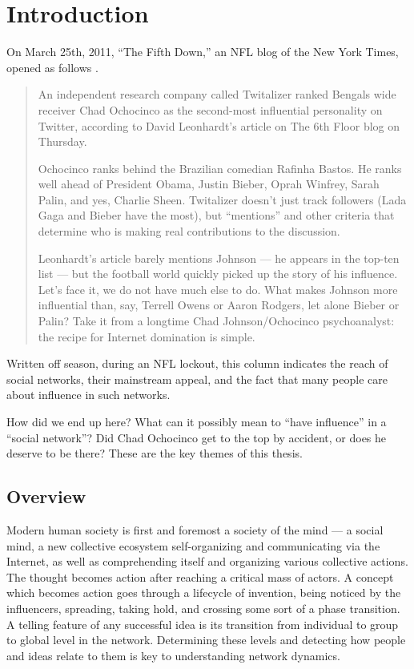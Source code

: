 \documentclass[10pt,oneside]{memoir}
\begin{document}
\mainmatter


\chapter{Introduction}
\label{introduction}

\begin{Spacing}{2}


On March 25th, 2011, ``The Fifth Down,'' an NFL blog of the New York Times, opened as follows \cite{tanier2011ochocinco}.


\begin{quote}
An independent research company called Twitalizer ranked Bengals wide receiver Chad Ochocinco as the second-most influential personality on Twitter, according to David Leonhardt's article on The 6th Floor blog on Thursday.


Ochocinco ranks behind the Brazilian comedian Rafinha Bastos. He ranks well ahead of President Obama, Justin Bieber, Oprah Winfrey, Sarah Palin, and yes, Charlie Sheen. Twitalizer doesn't just track followers (Lada Gaga and Bieber have the most), but ``mentions'' and other criteria that determine who is making real contributions to the discussion.


Leonhardt's article barely mentions Johnson --- he appears in the top-ten list --- but the football world quickly picked up the story of his influence. Let's face it, we do not have much else to do. What makes Johnson more influential than, say, Terrell Owens or Aaron Rodgers, let alone Bieber or Palin? Take it from a longtime Chad Johnson/Ochocinco psychoanalyst: the recipe for Internet domination is simple.
\end{quote}


Written off season, during an NFL lockout, this column indicates the reach of social networks, their mainstream appeal, and the fact that many people care about influence in such networks.


How did we end up here?  What can it possibly mean to ``have influence'' in a ``social network''?  Did Chad Ochocinco get to the top by accident, or does he deserve to be there?  These are the key themes of this thesis.


\pagebreak \section{Overview}
\label{overview}

Modern human society is first and foremost a society of the mind --- a social mind, a new collective ecosystem self-organizing and communicating via the Internet, as well as comprehending itself and organizing various collective actions.  The thought becomes action after reaching a critical mass of actors.   A concept which becomes action goes through a lifecycle of invention, being noticed by the influencers, spreading, taking hold, and crossing some sort of a phase transition.  A telling feature of any successful idea is its transition from individual to group to global level in the network.  Determining these levels and detecting how people and ideas relate to them is key to understanding network dynamics.



\end{Spacing}
\end{document}
